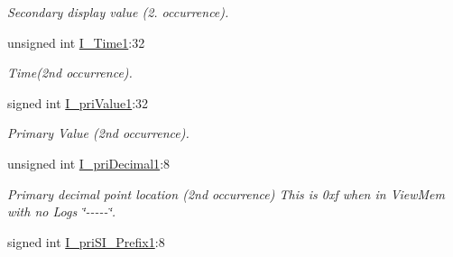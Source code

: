 \begin{DoxyCompactItemize}
\begin{DoxyCompactList}\small\item\em Secondary display value (2. occurrence). \item\end{DoxyCompactList}\item 
\hypertarget{structFluke_1_1Fluke189_1_1cmdr__QD0__t_a8212cc3a02e4fe9f6fe64edefb63fdec}{
unsigned int \hyperlink{structFluke_1_1Fluke189_1_1cmdr__QD0__t_a8212cc3a02e4fe9f6fe64edefb63fdec}{I\_\-Time1}:32}
\label{structFluke_1_1Fluke189_1_1cmdr__QD0__t_a8212cc3a02e4fe9f6fe64edefb63fdec}

\begin{DoxyCompactList}\small\item\em Time(2nd occurrence). \item\end{DoxyCompactList}\item 
\hypertarget{structFluke_1_1Fluke189_1_1cmdr__QD0__t_a6ce7ba734d1feffd605b311b95476c8a}{
signed int \hyperlink{structFluke_1_1Fluke189_1_1cmdr__QD0__t_a6ce7ba734d1feffd605b311b95476c8a}{I\_\-priValue1}:32}
\label{structFluke_1_1Fluke189_1_1cmdr__QD0__t_a6ce7ba734d1feffd605b311b95476c8a}

\begin{DoxyCompactList}\small\item\em Primary Value (2nd occurrence). \item\end{DoxyCompactList}\item 
\hypertarget{structFluke_1_1Fluke189_1_1cmdr__QD0__t_a2b023d452326d0c3b714befc51e769e9}{
unsigned int \hyperlink{structFluke_1_1Fluke189_1_1cmdr__QD0__t_a2b023d452326d0c3b714befc51e769e9}{I\_\-priDecimal1}:8}
\label{structFluke_1_1Fluke189_1_1cmdr__QD0__t_a2b023d452326d0c3b714befc51e769e9}

\begin{DoxyCompactList}\small\item\em Primary decimal point location (2nd occurrence) This is 0xf when in ViewMem with no Logs \char`\"{}-\/-\/-\/-\/-\/\char`\"{}. \item\end{DoxyCompactList}\item 
\hypertarget{structFluke_1_1Fluke189_1_1cmdr__QD0__t_afbe593e8475da6b924318bdb9b13117f}{
signed int \hyperlink{structFluke_1_1Fluke189_1_1cmdr__QD0__t_afbe593e8475da6b924318bdb9b13117f}{I\_\-priSI\_\-Prefix1}:8}
\label{structFluke_1_1Fluke189_1_1cmdr__QD0__t_afbe593e8475da6b924318bdb9b13117f}


\end{DoxyCompactItemize}
